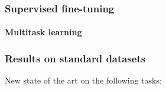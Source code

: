 \documentclass[9pt]{beamer}
\begin{document}
\begin{frame}
  \frametitle{Supervised fine-tuning}

  \framesubtitle{Multitask learning}

  \fontsize{7.5pt}{7.2}\selectfont

  \begin{figure}
    
  \end{figure}

\end{frame}

\begin{frame}

  \frametitle{Results on standard datasets}

  New state of the art on the following tasks:

  \bigskip


\end{frame}
\end{document}
